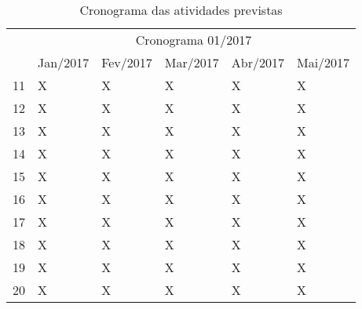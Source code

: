 \begin{table}[!htpb]
	\centering

	\begin{small} 
	  
		\setlength{\tabcolsep}{3pt} 


		\begin{tabular}{|p{5cm}|p{2cm}|p{2cm}|p{2cm}|p{2cm}|p{2cm}|}\hline
		 & \multicolumn{5}{c|}{Cronograma 01/2017}\\ \cline{2-6}
		\raisebox{1.5ex}{Entrevistas} & Jan/2017 & Fev/2017 & Mar/2017 & Abr/2017 & Mai/2017 \\ \hline

		11 & X & X & X & X & X \\ \hline
		12 & X & X & X & X & X \\ \hline
		13 & X & X & X & X & X \\ \hline
		14 & X & X & X & X & X \\ \hline
		15 & X & X & X & X & X \\ \hline
		16 & X & X & X & X & X \\ \hline
		17 & X & X & X & X & X \\ \hline
		18 & X & X & X & X & X \\ \hline
		19 & X & X & X & X & X \\ \hline
		20 & X & X & X & X & X \\ \hline

		\end{tabular} 
	\end{small}
	\caption{Cronograma das atividades previstas}
	\label{t_cronograma}
\end{table} 